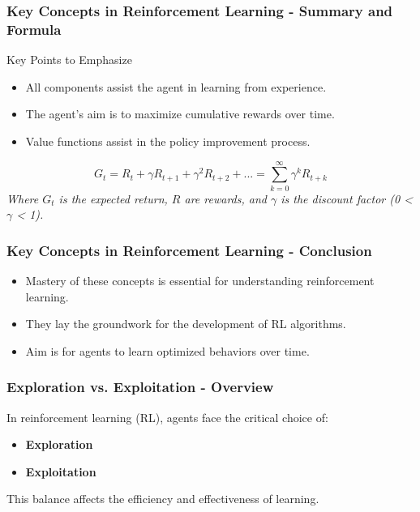 \documentclass{beamer}
\begin{document}
\begin{frame}[fragile]
    \frametitle{Key Concepts in Reinforcement Learning - Summary and Formula}
    \begin{block}{Key Points to Emphasize}
        \begin{itemize}
            \item All components assist the agent in learning from experience.
            \item The agent's aim is to maximize cumulative rewards over time.
            \item Value functions assist in the policy improvement process.
        \end{itemize}
    \end{block}
    
    \begin{equation}
        G_t = R_t + \gamma R_{t+1} + \gamma^2 R_{t+2} + ... = \sum_{k=0}^{\infty} \gamma^k R_{t+k}
    \end{equation}
    \textit{Where \( G_t \) is the expected return, \( R \) are rewards, and \( \gamma \) is the discount factor (0 < $\gamma$ < 1).}
\end{frame}

\begin{frame}[fragile]
    \frametitle{Key Concepts in Reinforcement Learning - Conclusion}
    \begin{itemize}
        \item Mastery of these concepts is essential for understanding reinforcement learning.
        \item They lay the groundwork for the development of RL algorithms.
        \item Aim is for agents to learn optimized behaviors over time.
    \end{itemize}
\end{frame}

\begin{frame}[fragile]
    \frametitle{Exploration vs. Exploitation - Overview}
    In reinforcement learning (RL), agents face the critical choice of:
    \begin{itemize}
        \item \textbf{Exploration}
        \item \textbf{Exploitation}
    \end{itemize}
    This balance affects the efficiency and effectiveness of learning.
\end{frame}
\end{document}
